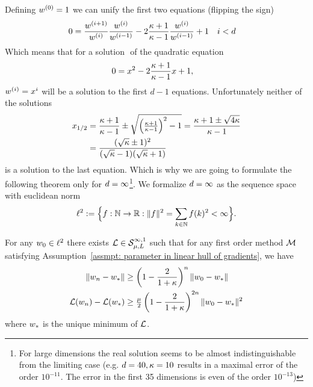 Defining \(\weights^{(0)} =1\) we can unify the first two equations (flipping
the sign)
\begin{align*}
	0&= 
	\frac{\weights^{(i+1)}}{\weights^{(i)}}\frac{\weights^{(i)}}{\weights^{(i-1)}}
	- 2\frac{\condition+1}{\condition -1}\frac{\weights^{(i)}}{\weights^{(i-1)}}
	+ 1  && i <d
\end{align*}
%
Which means that for a solution \(\) of the quadratic equation
\begin{align}\label{eq: coloring solution quadratic equation}
	0&= x^2 - 2\frac{\condition+1}{\condition -1}x + 1,
\end{align}
%
\(\weights^{(i)} = x^i\) will be a solution to the first \(d-1\) equations.
Unfortunately neither of the solutions
%
\begin{align*}
	x_{1/2} &= \frac{\condition+1}{\condition -1} \pm 
	\sqrt{\left(\tfrac{\condition+1}{\condition-1}\right)^2 -1}
	=\frac{\condition +1 \pm \sqrt{4\condition}}{\condition -1}\\
	&= \frac{(\sqrt{\condition}\pm 1)^2}{(\sqrt{\condition}-1)(\sqrt{\condition}+1)}
\end{align*}
%
is a solution to the last equation. Which is why we are going to formulate the
following theorem only for \(\dimension=\infty\)\footnote{
	For large dimensions the real solution seems to be almost
	indistinguishable from the limiting case (e.g. \(\dimension=40,
	\condition=10\) results in a maximal error of the order \(10^{-11}\). The
	error in the first 35 dimensions is even of the order \(10^{-13}\))
}.
We formalize \(\dimension=\infty\) as the sequence space with euclidean norm
\begin{align*}
	\sequenceSpace := \Big\{
		f:\naturals \to \reals : \| f\|^2 = \sum_{k\in\naturals} f(k)^2< \infty
	\Big\}.
\end{align*}
%
\begin{theorem}
	\label{thm: strong convexity complexity bound}
	For any \(\weights_0\in\sequenceSpace\) there exists
	\(\Loss\in\strongConvex[\infty,1]{\lbound}{\ubound}\) such that for any
	first order method \(\firstOrderMethod\) satisfying Assumption~\ref{assmpt:
	parameter in linear hull of gradients}, we have
	\begin{subequations}
	\begin{align}
		\|\weights_n - \minimum\|
		&\ge \left(1-\frac2{1+\condition}\right)^n \|\weights_0 - \minimum\| \\
		\Loss(\weights_n) - \Loss(\minimum)
		&\ge \tfrac{\lbound}{2}
		\left(1-\frac2{1+\condition}\right)^{2n} \|\weights_0 - \minimum\|^2
	\end{align}
	\end{subequations}
	where \(\minimum\) is the unique minimum of \(\Loss\).
\end{theorem}

